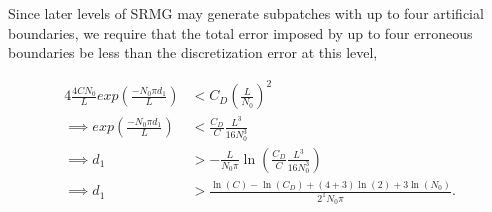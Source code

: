 \documentclass[final]{siamart1116}
\numberwithin{theorem}{section}
\begin{document}




Since later levels of SRMG may generate subpatches with up to four artificial boundaries, we require that the total error imposed by up to four erroneous boundaries be less than the discretization error at this level,

\begin{align}
  4 \frac{4C N_0}{L} exp(\frac{-N_0 \pi d_1}{L}) &< C_D \left(\frac{L}{N_0}\right)^2 \nonumber \\
 \implies  exp(\frac{-N_0 \pi d_1}{L}) &< \frac{C_D}{C} \frac{L^3}{16 N^3_0} \nonumber \\
  \implies d_1 &> -\frac{L}{N_0 \pi} \ln\left(\frac{C_D}{C} \frac{L^3}{16 N^3_0}\right) \nonumber \\
 \implies  d_1 &> \frac{\ln(C) - \ln(C_D) + (4+3) \ln(2) + 3 \ln(N_0)}{2^1 N_0 \pi}. 
\end{align}


\end{document}
